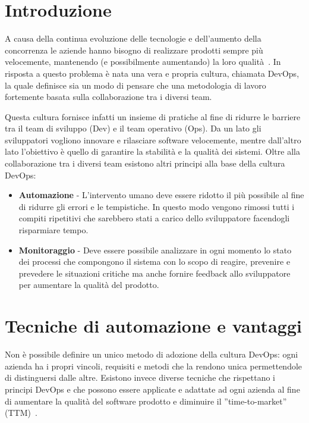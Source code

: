 
\section{Introduzione}
A causa della continua evoluzione delle tecnologie e dell'aumento della concorrenza le aziende hanno bisogno di realizzare prodotti sempre più velocemente, 
mantenendo (e possibilmente aumentando) la loro qualità~\cite{krief2019learning}. 
In risposta a questo problema è nata una vera e propria cultura, chiamata DevOps, 
la quale definisce sia un modo di pensare che una metodologia di lavoro fortemente basata sulla collaborazione tra i diversi team.

Questa cultura fornisce infatti un insieme di pratiche al fine di ridurre le barriere tra il team di sviluppo (Dev) e il team operativo (Ops). 
Da un lato gli sviluppatori vogliono innovare e rilasciare software velocemente, 
mentre dall'altro lato l'obiettivo è quello di garantire la stabilità e la qualità dei sistemi.
Oltre alla collaborazione tra i diversi team esistono altri principi alla base della cultura DevOps:

\begin{itemize}
    \item \textbf{Automazione} - L'intervento umano deve essere ridotto il più possibile al fine di ridurre gli errori e le tempistiche. In questo modo vengono rimossi tutti i compiti ripetitivi che sarebbero stati a carico dello sviluppatore facendogli risparmiare tempo.
    
    \item \textbf{Monitoraggio} - Deve essere possibile analizzare in ogni momento lo stato dei processi che compongono il sistema con lo scopo di reagire, prevenire e prevedere le situazioni critiche ma anche fornire feedback allo sviluppatore per aumentare la qualità del prodotto.
\end{itemize}

\section{Tecniche di automazione e vantaggi}
Non è possibile definire un unico metodo di adozione della cultura DevOps: 
ogni azienda ha i propri vincoli, 
requisiti e metodi che la rendono unica permettendole di distinguersi dalle altre.
Esistono invece diverse tecniche che rispettano i principi DevOps e che possono essere applicate e adattate ad ogni azienda al fine di aumentare la qualità del software prodotto e diminuire il ''time-to-market'' (TTM)~\cite{devis2016effective}.

